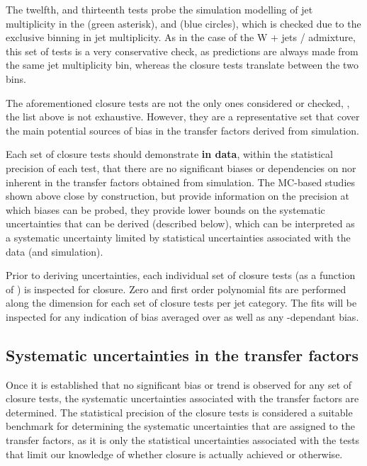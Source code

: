 The twelfth, and thirteenth tests probe the simulation modelling of
jet multiplicity in the \ej (green asterisk), and \eej (blue circles),
which is checked due to the exclusive binning in jet multiplicity.  As
in the case of the W + jets / \ttbar admixture, this set of tests is a
very conservative check, as predictions are always made from the same
jet multiplicity bin, whereas the closure tests translate between the
two bins.

The aforementioned closure tests are not the only ones considered or
checked, \ie, the list above is not exhaustive. However, they are a
representative set that cover the main potential sources of bias in
the transfer factors derived from simulation. 

Each set of closure tests should demonstrate {\bf in data}, within the
statistical precision of each test, that there are no significant
biases or dependencies on \njet nor \scalht inherent in the transfer
factors obtained from simulation. The MC-based studies shown above
close by construction, but provide information on the precision at
which biases can be probed, \ie they provide lower bounds on the
systematic uncertainties that can be derived (described below), which
can be interpreted as a systematic uncertainty limited by statistical
uncertainties associated with the data (and simulation).

Prior to deriving uncertainties, each individual set of closure tests
(as a function of \HT) is inspected for closure. Zero and first order
polynomial fits are performed along the \scalht dimension for each set
of closure tests per jet category. The fits will be inspected for any
indication of bias averaged over \scalht as well as any
\scalht-dependant bias.

\subsection{Systematic uncertainties in the transfer factors\label{sec:syst-from-closure}}

Once it is established that no significant bias or trend is observed
for any set of closure tests, the systematic uncertainties associated
with the transfer factors are determined. The statistical precision of
the closure tests is considered a suitable benchmark for determining
the systematic uncertainties that are assigned to the transfer
factors, as it is only the statistical uncertainties associated with
the tests that limit our knowledge of whether closure is actually
achieved or otherwise.

